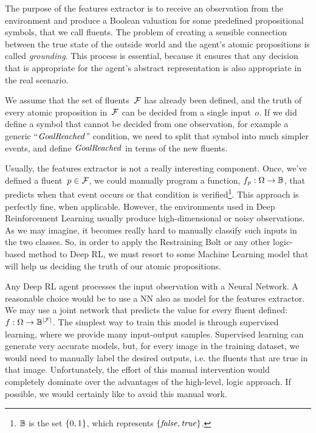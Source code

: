 The purpose of the features extractor is to receive an observation from the
environment and produce a Boolean valuation for some predefined propositional
symbols, that we call fluents. The problem of creating a sensible connection
between the true state of the outside world and the agent's atomic
propositions is called \emph{grounding}. This process is essential, because it
ensures that any decision that is appropriate for the agent's abstract
representation is also appropriate in the real scenario.

We assume that the set of fluents~$\mathcal{F}$ has already been defined, and the
truth of every atomic proposition in~$\mathcal{F}$ can be decided from a single
input~$o$. If we did define a symbol that cannot be decided from one
observation, for example a generic ``$\text{\textit{GoalReached}}$'' condition, we
need to split that symbol into much simpler events, and define
$\text{\textit{GoalReached}}$ in terms of the new fluents.

Usually, the features extractor is not a really interesting component. Once,
we've defined a fluent~$p \in \mathcal{F}$, we could manually program a
function, $f_p: \Omega \to \mathbb{B}$, that predicts when that event occurs or
that condition is verified\footnote{$\mathbb{B}$ is the set $\{0, 1\}$, which
represents $\{\text{\textit{false}}, \text{\textit{true}}\}$.}.  This approach is perfectly fine, when
applicable.  However, the environments used in Deep Reinforcement Learning
usually produce high-dimensional or noisy observations. As we may imagine, it
becomes really hard to manually classify such inputs in the two classes. So,
in order to apply the Restraining Bolt or any other logic-based method to Deep
RL, we must resort to some Machine Learning model that will help us deciding
the truth of our atomic propositions.

Any Deep RL agent processes the input observation with a Neural Network. A
reasonable choice would be to use a NN also as model for the features
extractor. We may use a joint network that predicts the value for every fluent
defined: $f: \Omega \to \mathbb{B}^{\lvert\mathcal{F}\rvert}$. The simplest way to train this
model is through supervised learning, where we provide many input-output
samples. Supervised learning can generate very accurate models, but, for every
image in the training dataset, we would need to manually label the desired
outputs, i.e. the fluents that are true in that image. Unfortunately, the
effort of this manual intervention would completely dominate over the
advantages of the high-level, logic approach. If possible, we would certainly
like to avoid this manual work. 

